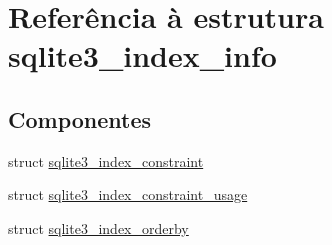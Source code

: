\hypertarget{structsqlite3__index__info}{\section{Referência à estrutura sqlite3\-\_\-index\-\_\-info}
\label{structsqlite3__index__info}
}
\subsection*{Componentes}
\begin{DoxyCompactItemize}
\item 
struct \hyperlink{structsqlite3__index__info_1_1sqlite3__index__constraint}{sqlite3\-\_\-index\-\_\-constraint}
\item 
struct \hyperlink{structsqlite3__index__info_1_1sqlite3__index__constraint__usage}{sqlite3\-\_\-index\-\_\-constraint\-\_\-usage}
\item 
struct \hyperlink{structsqlite3__index__info_1_1sqlite3__index__orderby}{sqlite3\-\_\-index\-\_\-orderby}
\end{DoxyCompactItemize}
